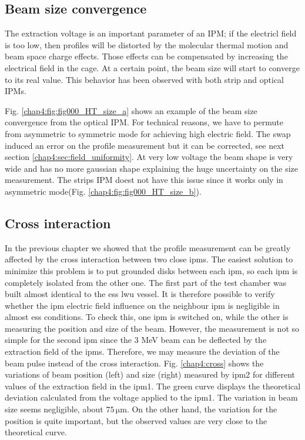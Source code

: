\begin{refsection}
  \subsection{Beam size convergence}

  The extraction voltage is an important parameter of an IPM; if the electricl field is too low, then profiles will be distorted by the molecular thermal motion and beam space charge effects. Those effects can be compensated by increasing the electrical field in the cage. At a certain point, the beam size will start to converge to its real value. This behavior has been observed with both strip and optical IPMs.
  

  Fig. \ref{chap4:fig:fig000_HT_size_a} shows an example of the beam size convergence from the optical IPM. For technical reasons, we have to permute from asymmetric to symmetric mode for achieving high electric field. The swap induced an error on the profile measurement but it can be corrected, see next section \ref{chap4:sec:field_uniformity}. At very low voltage the beam shape is very wide and has no more gaussian shape explaining the huge uncertainty on the size measurement. The strips IPM doest not have this issue since it works only in asymmetric mode(Fig. \ref{chap4:fig:fig000_HT_size_b}).

  \subsection{Cross interaction }

  In the previous chapter we showed that the profile measurement can be greatly affected by the cross interaction between two close \acrshort{ipm}s. The easiest solution to minimize this problem is to put grounded disks between each \acrshort{ipm}, so each \acrshort{ipm} is completely isolated from the other one. The first part of the test chamber was built almost identical to the \acrshort{ess} \acrshort{lwu} vessel. It is therefore possible to verify whether the \acrshort{ipm} electric field influence on the neighbour \acrshort{ipm}  is negligible in almost \acrshort{ess} conditions. To check this, one \acrshort{ipm} is switched on, while the other is measuring the position and size of the beam. However, the measurement is not so simple for the second \acrshort{ipm} since the 3 MeV beam can be deflected by the extraction field of the \acrshort{ipm}s. Therefore, we may measure the deviation of the beam pulse instead of the cross interaction. Fig. \ref{chap4:cross} shows the variations of beam position (left) and size (right) measured by \acrshort{ipm}2 for different values of the extraction field in the \acrshort{ipm}1. The green curve displays the theoretical deviation calculated from the voltage applied to the \acrshort{ipm}1. The variation in beam size seems negligible, about $75\,\mathrm{\mu m}$. On the other hand, the variation for the position is quite important, but the observed values are very close to the theoretical curve.


\end{refsection}
